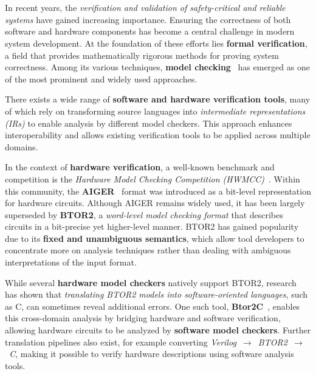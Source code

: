 \chapter{\bevezetes}

In recent years, the \textit{verification and validation of safety-critical and reliable systems} have gained increasing importance. Ensuring the correctness of both software and hardware components has become a central challenge in modern system development. At the foundation of these efforts lies \textbf{formal verification}, a field that provides mathematically rigorous methods for proving system correctness. Among its various techniques, \textbf{model checking}~\cite{modelChecking}\cite{systemEngineering} has emerged as one of the most prominent and widely used approaches.

There exists a wide range of \textbf{software and hardware verification tools}, many of which rely on transforming source languages into \textit{intermediate representations (IRs)} to enable analysis by different model checkers. This approach enhances interoperability and allows existing verification tools to be applied across multiple domains.

In the context of \textbf{hardware verification}, a well-known benchmark and competition is the \textit{Hardware Model Checking Competition (HWMCC)}~\cite{hwmcc}. Within this community, the \textbf{AIGER}~\cite{AIGER} format was introduced as a bit-level representation for hardware circuits. Although AIGER remains widely used, it has been largely superseded by \textbf{BTOR2}, a \textit{word-level model checking format} that describes circuits in a bit-precise yet higher-level manner. BTOR2 has gained popularity due to its \textbf{fixed and unambiguous semantics}, which allow tool developers to concentrate more on analysis techniques rather than dealing with ambiguous interpretations of the input format.

While several \textbf{hardware model checkers} natively support BTOR2, research has shown that \textit{translating BTOR2 models into software-oriented languages}, such as C, can sometimes reveal additional errors. One such tool, \textbf{Btor2C}~\cite{btor2c}, enables this cross-domain analysis by bridging hardware and software verification, allowing hardware circuits to be analyzed by \textbf{software model checkers}. Further translation pipelines also exist, for example converting \textit{Verilog~$\rightarrow$~BTOR2~$\rightarrow$~C}, making it possible to verify hardware descriptions using software analysis tools.

